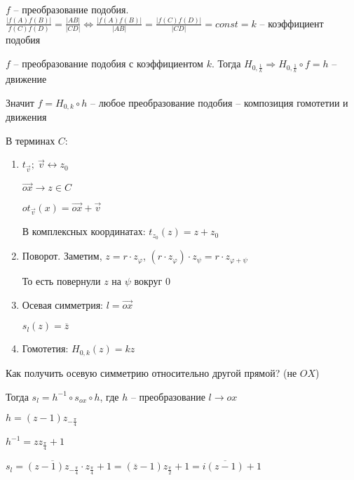\documentclass[14pt, letter paper]{article}
\begin{document}
\vspace{5mm}

$f$ -- преобразование подобия. $\frac{|f(A)f(B)|}{f(C)f(D)} = \frac{|AB|}{|CD|} \Leftrightarrow \frac{|f(A)f(B)|}{|AB|} = \frac{|f(C)f(D)|}{|CD|} = const = k$ -- коэффициент подобия

$f$ -- преобразование подобия с коэффициентом $k$. Тогда $H_{0, \frac{1}{k}} \Rightarrow H_{0, \frac{1}{k}} \circ f = h$ -- движение

Значит $f = H_{0, k} \circ h$ -- любое преобразование подобия -- композиция гомотетии и движения

\vspace{5mm}

В терминах $C$: 

\begin{enumerate}
    \item $t_{\overrightarrow{v}};\ \overrightarrow{v} \leftrightarrow z_0$
    
    $\overrightarrow{ox} \rightarrow z \in C$

    $ot_{\overrightarrow{v}}(x) = \overrightarrow{ox} + \overrightarrow{v}$

    В комплексных координатах: $t_{z_0}(z) = z + z_0$

    \item Поворот. Заметим, $z = r \cdot z_\varphi$, $(r \cdot z_\varphi) \cdot z_\psi = r \cdot z_{\varphi + \psi}$
    
    То есть повернули $z$ на $\psi$ вокруг 0

    \item Осевая симметрия: $l = \overrightarrow{ox}$
    
    $s_l(z) = \overline{z}$

    \item Гомотетия: $H_{0, k}(z) = kz$
\end{enumerate}

Как получить осевую симметрию относительно другой прямой? (не $OX$)

Тогда $s_l = h^{-1} \circ s_{ox} \circ h$, где $h$ -- преобразование $l \rightarrow ox$

$h = (z - 1) z_{-\frac{\pi}{4}}$

$h^{-1} = z z_\frac{\pi}{4} + 1$

$s_l = \overline{(z - 1)z_{-\frac{\pi}{4}}} \cdot z_{\frac{\pi}{4}} + 1 = (\overline{z} - 1)z_\frac{\pi}{2} + 1 = i\overline{(z - 1)} + 1$

\vspace{5mm}
\end{document}
